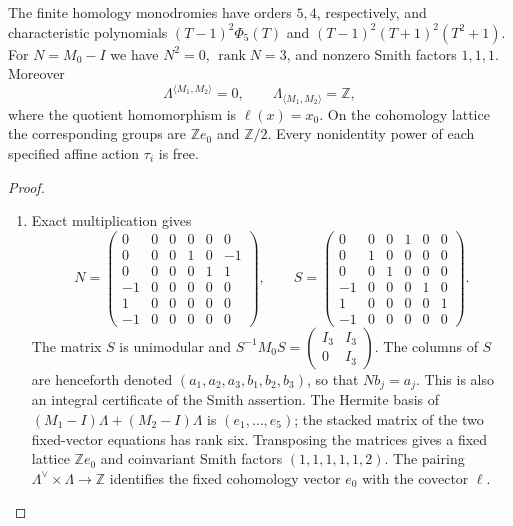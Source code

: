\begin{theorem}\hypertarget{tag-02QI}{}\label{night:P1.1}
The finite homology monodromies have orders $5,4$, respectively, and
characteristic polynomials
$(T-1)^2\Phi _5(T)$ and $(T-1)^2(T+1)^2(T^2+1)$.
For $N=M_0-I$ we have $N^2=0$, $\operatorname{rank}N=3$, and
nonzero Smith factors $1,1,1$.  Moreover
\[
 \Lambda^{\langle M_1,M_2\rangle}=0,\qquad
 \Lambda_{\langle M_1,M_2\rangle}=\mathbb Z,
\]
where the quotient homomorphism is $\ell(x)=x_0$.
On the cohomology lattice the corresponding groups are $\mathbb Ze_0$
and $\mathbb Z/2$.  Every nonidentity power of each specified affine
action $\tau_i$ is free.
\end{theorem}
\begin{proof}
\begin{enumerate}[label={$\langle1\rangle$\arabic*.}]
\item Exact multiplication gives
\[
N=\begin{pmatrix}
0&0&0&0&0&0\\0&0&0&1&0&-1\\0&0&0&0&1&1\\
-1&0&0&0&0&0\\1&0&0&0&0&0\\-1&0&0&0&0&0
\end{pmatrix},\qquad
S=\begin{pmatrix}
0&0&0&1&0&0\\0&1&0&0&0&0\\0&0&1&0&0&0\\
-1&0&0&0&1&0\\1&0&0&0&0&1\\-1&0&0&0&0&0
\end{pmatrix}.
\]
The matrix $S$ is unimodular and
$S^{-1}M_0S=\left(\begin{smallmatrix}I_3&I_3\\0&I_3\end{smallmatrix}\right)$.
The columns of $S$ are henceforth denoted
$(a_1,a_2,a_3,b_1,b_2,b_3)$, so that $Nb_j=a_j$.
This is also an integral certificate of the Smith assertion.
The Hermite basis of
$(M_1-I)\Lambda+(M_2-I)\Lambda$ is $(e_1,\ldots,e_5)$;
the stacked matrix of the two fixed-vector equations has rank six.
Transposing the matrices gives a fixed lattice $\mathbb Ze_0$ and
coinvariant Smith factors $(1,1,1,1,1,2)$.  The pairing
$\Lambda^\vee\times\Lambda\longrightarrow\mathbb Z$ identifies the
fixed cohomology vector $e_0$ with the covector $\ell$.


\end{enumerate}
\end{proof}
